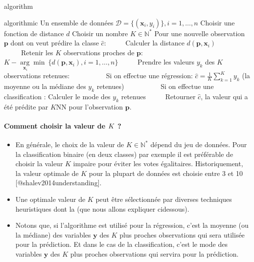 \documentclass[letterpaper,11pt,english]{sphinxmanual}
\begin{document}
\begin{sphinxuseclass}{algorithm}
\begin{sphinxuseclass}{algorithmic}
\sphinxAtStartPar
Un ensemble de données
\(\mathcal{D} = \{(\mathbf{x}_i, y_i)\}, i = 1, \dots,n\)
Choisir une fonction de distance \(d\) Choisir un nombre
\(K \in \mathbb{N}^*\) Pour une nouvelle observation
\(\textbf{p}\) dont on veut prédire la classe \(\hat{c}\):
     Calculer la distance \(d(\textbf{p},\mathbf{x}_i)\)
     Retenir les \(K\) observations proches de
\(\textbf{p}\):
\(\underset{\mathbf{x}_i}{K-\arg \min}\  \{d(\textbf{p},\mathbf{x}_i), i=1, \dots, n\}\)
     Prendre les valeurs \(\displaystyle y_{k}\) des \(K\)
observations retenues:           Si on effectue une régression:
\(\hat{c}= \frac{1}{K}\sum_{k=1}^{K} y_k\) (la moyenne ou la
médiane des \(y_k\) retenues)           Si on effectue une
classification : Calculer le mode des \(y_k\) retenues
     Retourner \(\hat{c}\), la valeur qui a été prédite par
\(K\)\sphinxhyphen{}NN pour l’observation \(\textbf{p}\).

\end{sphinxuseclass}
\end{sphinxuseclass}

\paragraph{Comment choisir la valeur de \protect\(K\protect\) ?}
\label{\detokenize{chapter3:comment-choisir-la-valeur-de-k}}\begin{itemize}
\item {} 
\sphinxAtStartPar
En générale, le choix de la valeur de \(K \in \mathbb{N}^{*}\)
dépend du jeu de données. Pour la classification binaire (en deux
classes) par exemple il est préférable de choisir la valeur \(K\)
impaire pour éviter les votes égalitaires. Historiquement, la valeur
optimale de \(K\) pour la plupart de données est choisie entre 3
et 10 {[}@shalev2014understanding{]}.

\item {} 
\sphinxAtStartPar
Une optimale valeur de \(K\) peut être sélectionnée par diverses
techniques heuristiques dont la  (que nous
allons expliquer ci\sphinxhyphen{}dessous).

\item {} 
\sphinxAtStartPar
Notons que, si l’algorithme est utilisé pour la régression, c’est la
moyenne (ou la médiane) des variables \(\mathbf{y}\) des
\(K\) plus proches observations qui sera utilisée pour la
prédiction. Et dans le cas de la classification, c’est le mode des
variables \(\mathbf{y}\) des \(K\) plus proches observations
qui servira pour la prédiction.

\end{itemize}
\end{document}
